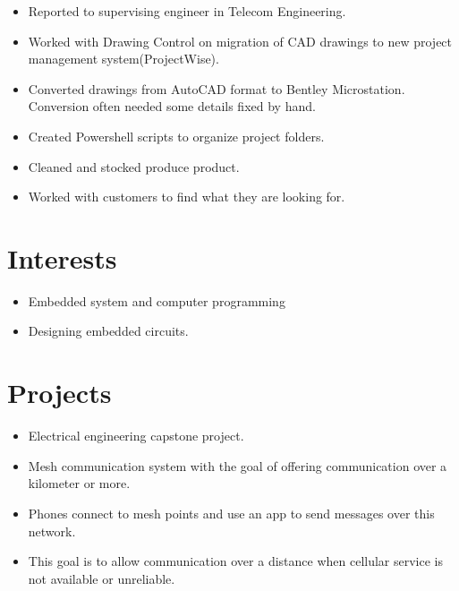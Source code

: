 \documentclass{lsanche_cv}
\begin{document}
\begin{multicols*}{2}
    \divider

    \begin{itemize}
      \item Reported to supervising engineer in Telecom Engineering.
      \item Worked with Drawing Control on migration of CAD drawings to new project management system(ProjectWise).
      \item Converted drawings from AutoCAD format to Bentley Microstation. Conversion often needed some details fixed by hand.
      \item Created Powershell scripts to organize project folders.
    \end{itemize}

    \divider
    
    \begin{itemize}
      \item Cleaned and stocked produce product.
      \item Worked with customers to find what they are looking for.
    \end{itemize}

    \columnbreak
    
  \section{Interests}
    \begin{itemize}
      \item Embedded system and computer programming
      \item Designing embedded circuits.
    \end{itemize}

    \section{Projects}

      \begin{itemize}
        \item Electrical engineering capstone project.
        \item Mesh communication system with the goal of offering communication over a kilometer or more. 
        \item Phones connect to mesh points and use an app to send messages over this network.
        \item This goal is to allow communication over a distance when cellular service is not available or unreliable.
      \end{itemize}


\end{multicols*}
\end{document}

